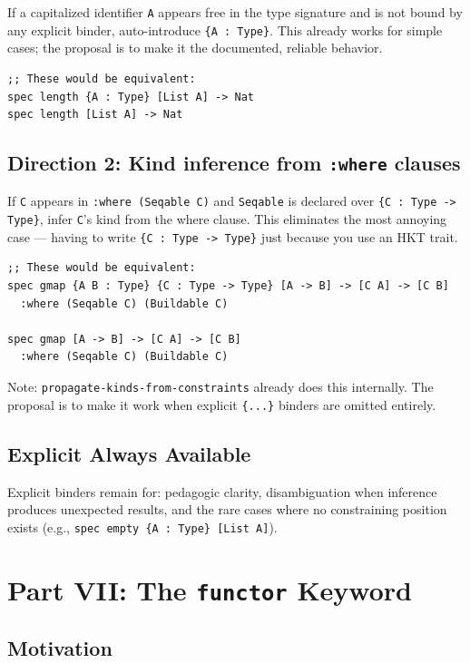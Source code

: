 \documentclass[11pt]{article}
\begin{document}
If a capitalized identifier \texttt{A} appears free in the type signature and is not
bound by any explicit binder, auto-introduce \texttt{\{A : Type\}}. This already works
for simple cases; the proposal is to make it the documented, reliable behavior.

\begin{verbatim}
;; These would be equivalent:
spec length {A : Type} [List A] -> Nat
spec length [List A] -> Nat
\end{verbatim}
\subsection{Direction 2: Kind inference from \texttt{:where} clauses}
\label{sec:org01efac9}

If \texttt{C} appears in \texttt{:where (Seqable C)} and \texttt{Seqable} is declared over
\texttt{\{C : Type -> Type\}}, infer \texttt{C}'s kind from the where clause. This eliminates
the most annoying case --- having to write \texttt{\{C : Type -> Type\}} just because
you use an HKT trait.

\begin{verbatim}
;; These would be equivalent:
spec gmap {A B : Type} {C : Type -> Type} [A -> B] -> [C A] -> [C B]
  :where (Seqable C) (Buildable C)

spec gmap [A -> B] -> [C A] -> [C B]
  :where (Seqable C) (Buildable C)
\end{verbatim}

Note: \texttt{propagate-kinds-from-constraints} already does this internally. The
proposal is to make it work when explicit \texttt{\{...\}} binders are omitted entirely.
\subsection{Explicit Always Available}
\label{sec:orge509b73}

Explicit binders remain for: pedagogic clarity, disambiguation when inference
produces unexpected results, and the rare cases where no constraining position
exists (e.g., \texttt{spec empty \{A : Type\} [List A]}).
\section{Part VII: The \texttt{functor} Keyword}
\label{sec:org643c950}

\subsection{Motivation}
\label{sec:org8ecdc2a}
\end{document}
